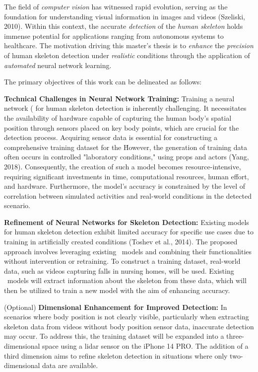 
The field of {\em computer vision} has witnessed rapid evolution, serving as the foundation for understanding visual information in images and videos (\scc Szeliski, 2010). Within this context, the accurate {\em detection} of the {\em human skeleton} holds immense potential for applications ranging from autonomous systems to healthcare. The motivation driving this master's thesis is to {\em enhance} the {\em precision} of human skeleton detection under {\em realistic} conditions through the application of {\em automated} neural network learning.

The primary objectives of this work can be delineated as follows:

\startitemize
    \item {\bf Technical Challenges in Neural Network Training:} Training a neural network (\NN\) for human skeleton detection is inherently challenging. It necessitates the availability of hardware capable of capturing the human body's spatial position through sensors placed on key body points, which are crucial for the detection process. Acquiring sensor data is essential for constructing a comprehensive training dataset for the \NN\. However, the generation of training data often occurs in controlled "laboratory conditions," using props and actors (\scc Yang, 2018). Consequently, the creation of such a model becomes resource-intensive, requiring significant investments in time, computational resources, human effort, and hardware. Furthermore, the model's accuracy is constrained by the level of correlation between simulated activities and real-world conditions in the detected scenario.
    \item {\bf Refinement of Neural Networks for Skeleton Detection:} Existing models for human skeleton detection exhibit limited accuracy for specific use cases due to training in artificially created conditions (\scc Toshev et al., 2014). The proposed approach involves leveraging existing \NN\ models and combining their functionalities without intervention or retraining. To construct a training dataset, real-world data, such as videos capturing falls in nursing homes, will be used. Existing \NN\ models will extract information about the skeleton from these data, which will then be utilized to train a new model with the aim of enhancing accuracy.
    \item (Optional) {\bf Dimensional Enhancement for Improved Detection:} In scenarios where body position is not clearly visible, particularly when extracting skeleton data from videos without body position sensor data, inaccurate detection may occur. To address this, the training dataset will be expanded into a three-dimensional space using a lidar sensor on the iPhone 14 PRO. The addition of a third dimension aims to refine skeleton detection in situations where only two-dimensional data are available.
\stopitemize

